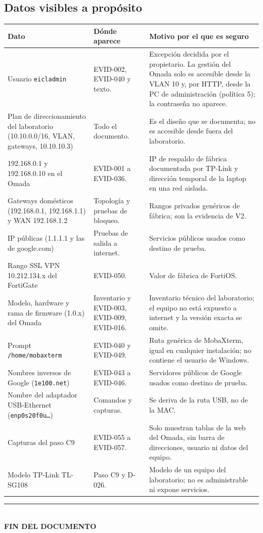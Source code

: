 \documentclass[11pt,a4paper]{article}
\newcommand{\cab}{\rowcolor{light}}
\begin{document}
\subsection{Datos visibles a propósito}
{\small
\begin{longtable}{L{3.4cm} L{6.0cm} L{5.6cm}}
  \toprule
  \cab\textbf{Dato} & \textbf{Dónde aparece} & \textbf{Motivo por el que es seguro}\\
  \midrule
  \endhead
  Usuario \texttt{eicladmin} & EVID-002, EVID-040 y texto. & Excepción decidida por el propietario. La gestión del Omada solo es accesible desde la VLAN 10 y, por HTTP, desde la PC de administración (política 5); la contraseña no aparece.\\
  Plan de direccionamiento del laboratorio (10.10.0.0/16, VLAN, gateways, 10.10.10.3) & Todo el documento. & Es el diseño que se documenta; no es accesible desde fuera del laboratorio.\\
  192.168.0.1 y 192.168.0.10 en el Omada & EVID-001 a EVID-036. & IP de respaldo de fábrica documentada por TP-Link y dirección temporal de la laptop en una red aislada.\\
  Gateways domésticos (192.168.0.1, 192.168.1.1) y WAN 192.168.1.2 & Topología y pruebas de bloqueo. & Rangos privados genéricos de fábrica; son la evidencia de V2.\\
  IP públicas (1.1.1.1 y las de google.com) & Pruebas de salida a internet. & Servicios públicos usados como destino de prueba.\\
  Rango SSL VPN 10.212.134.x del FortiGate & EVID-050. & Valor de fábrica de FortiOS.\\
  Modelo, hardware y rama de firmware (1.0.x) del Omada & Inventario y EVID-003, EVID-009, EVID-016. & Inventario técnico del laboratorio; el equipo no está expuesto a internet y la versión exacta se omite.\\
  Prompt \texttt{/home/mobaxterm} & EVID-040 y EVID-049. & Ruta genérica de MobaXterm, igual en cualquier instalación; no contiene el usuario de Windows.\\
  Nombres inversos de Google (\texttt{1e100.net}) & EVID-043 a EVID-046. & Servidores públicos de Google usados como destino de prueba.\\
  Nombre del adaptador USB-Ethernet (\texttt{enp0s20f0u\ldots}) & Comandos y capturas. & Se deriva de la ruta USB, no de la MAC.\\
  Capturas del paso C9 & EVID-055 a EVID-057. & Solo muestran tablas de la web del Omada, sin barra de direcciones, usuario ni datos del equipo.\\
  Modelo TP-Link TL-SG108 & Paso C9 y D-026. & Modelo de un equipo del laboratorio; no es administrable ni expone servicios.\\
  \bottomrule
\end{longtable}
}

\begin{center}
  \vspace{-2pt}
  {\color{navy}\rule{0.5\textwidth}{0.6pt}}\\[4pt]
  {\sffamily\bfseries\color{navy}FIN DEL DOCUMENTO}
\end{center}
\end{document}
